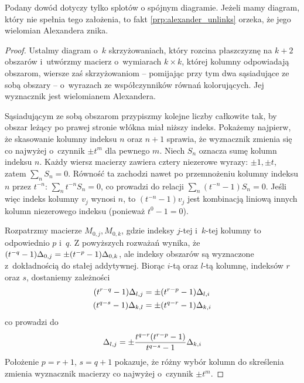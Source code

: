 Podany dowód dotyczy tylko splotów o spójnym diagramie.
Jeżeli mamy diagram, który nie spełnia tego założenia, to fakt \ref{prp:alexander_unlinks} orzeka, że jego wielomian Alexandera znika.

\begin{proof}
    Ustalmy diagram o~$k$ skrzyżowaniach, który rozcina płaszczyznę na $k+2$ obszarów i~utwórzmy macierz o~wymiarach $k \times k$, której kolumny odpowiadają obszarom, wiersze zaś skrzyżowaniom -- pomijając przy tym dwa sąsiadujące ze sobą obszary -- o~wyrazach ze współczynników równań kolorujących.
    Jej wyznacznik jest wielomianem Alexandera.

    Sąsiadującym ze sobą obszarom przypiszmy kolejne liczby całkowite tak, by obszar leżący po prawej stronie włókna miał niższy indeks.
    Pokażemy najpierw, że skasowanie kolumny indeksu $n$ oraz $n+1$ sprawia, że wyznacznik zmienia się co najwyżej o~czynnik $\pm t^m$ dla pewnego $m$.
    Niech $S_n$ oznacza sumę kolumn indeksu $n$.
    Każdy wiersz macierzy zawiera cztery niezerowe wyrazy: $\pm 1, \pm t$, zatem $\sum_n S_n = 0$.
    Równość ta zachodzi nawet po przemnożeniu kolumny indeksu $n$ przez $t^{-n}$: $\sum_n t^{-n}S_n = 0$, co prowadzi do relacji $\sum_n (t^{-n}-1) S_n = 0$.
    Jeśli więc indeks kolumny $v_j$ wynosi $n$, to $(t^{-n}-1)v_j$ jest kombinacją liniową innych kolumn niezerowego indeksu (ponieważ $t^0 - 1 = 0$).

    Rozpatrzmy macierze $M_{0,j}, M_{0,k}$, gdzie indeksy $j$-tej i~$k$-tej kolumny to odpowiednio $p$ i~$q$.
    Z powyższych rozważań wynika, że $(t^{-q}-1) \Delta_{0,j} = \pm (t^{-p}-1)\Delta_{0,k}$, ale indeksy obszarów są wyznaczone z~dokładnością do stałej addytywnej.
    Biorąc $i$-tą oraz $l$-tą kolumnę, indeksów $r$ oraz $s$, dostaniemy zależności
    \begin{align}
        (t^{r-q}-1) \Delta_{l,j} & = \pm (t^{r-p} - 1)\Delta_{l,i} \\
        (t^{q-s}-1) \Delta_{k,l} & = \pm (t^{q-r} - 1)\Delta_{k,i}
    \end{align}
    co prowadzi do
    \begin{equation}
        \Delta_{l,j} = \pm \frac{t^{q-r}(t^{r-p}-1)}{t^{q-s}-1} \Delta_{k,i}
    \end{equation}
    Położenie $p = r +1$, $s =q+1$ pokazuje, że różny wybór kolumn do skreślenia zmienia wyznacznik macierzy co najwyżej o~czynnik $\pm t^m$.


\end{proof}
